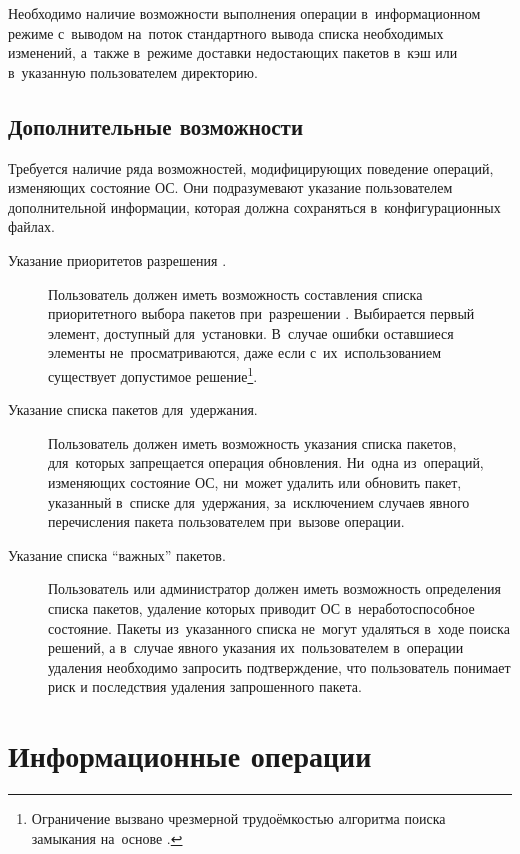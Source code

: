 Необходимо наличие возможности выполнения операции в~информационном режиме с~выводом на~поток  стандартного вывода списка необходимых изменений,
а~также в~режиме доставки недостающих пакетов в~кэш или в~указанную пользователем директорию.

\subsection{Дополнительные возможности}
\label{advfeatures}

Требуется наличие ряда возможностей, модифицирующих поведение операций, изменяющих состояние ОС.
Они подразумевают указание пользователем дополнительной информации,
которая должна сохраняться в~конфигурационных файлах. 

\begin{description}

\item[Указание приоритетов разрешения .]
Пользователь должен иметь возможность составления списка приоритетного выбора пакетов при~разрешении .
Выбирается первый элемент, доступный для~установки.
В~случае ошибки оставшиеся элементы не~просматриваются,
даже если с~их~использованием существует допустимое решение\footnote{
Ограничение вызвано чрезмерной трудоёмкостью алгоритма поиска замыкания на~основе .
}.

\item[Указание списка пакетов для~удержания.]
Пользователь должен иметь возможность указания списка пакетов, для~которых запрещается операция обновления.
Ни~одна из~операций, изменяющих состояние ОС, ни~может удалить или обновить пакет, указанный в~списке для~удержания,
за~исключением случаев явного перечисления пакета пользователем при~вызове операции.

\item[Указание списка ``важных'' пакетов.]
Пользователь или администратор должен иметь возможность определения списка пакетов, 
удаление которых приводит ОС в~неработоспособное состояние.
Пакеты из~указанного списка не~могут удаляться в~ходе поиска решений, а в~случае явного указания их~пользователем в~операции удаления
необходимо запросить подтверждение, что пользователь понимает риск и последствия удаления запрошенного пакета.

\end{description}

\section{Информационные операции}

